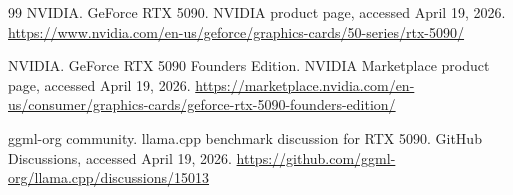 \documentclass[11pt,a4paper]{article}
\begin{document}
\begin{thebibliography}{99}
NVIDIA.
\newblock GeForce RTX 5090.
\newblock NVIDIA product page, accessed April 19, 2026.
\newblock \url{https://www.nvidia.com/en-us/geforce/graphics-cards/50-series/rtx-5090/}

NVIDIA.
\newblock GeForce RTX 5090 Founders Edition.
\newblock NVIDIA Marketplace product page, accessed April 19, 2026.
\newblock \url{https://marketplace.nvidia.com/en-us/consumer/graphics-cards/geforce-rtx-5090-founders-edition/}

ggml-org community.
\newblock llama.cpp benchmark discussion for RTX 5090.
\newblock GitHub Discussions, accessed April 19, 2026.
\newblock \url{https://github.com/ggml-org/llama.cpp/discussions/15013}

\end{thebibliography}
\end{document}
